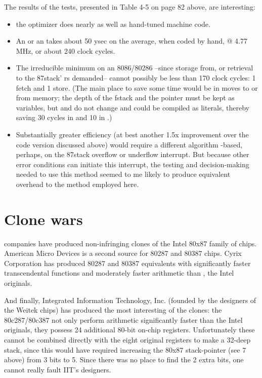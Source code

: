 The results of the tests, presented in Table 4-5 on page 82 above,
are interesting:
\begin{itemize}
    \item the optimizer does nearly as well as hand-tuned machine code.
    \item An  or an  takes about 50 ysec on the average, when coded by hand, @ 4.77 MHz, or about 240 clock cycles.
    \item The irreducible minimum on an 8086/80286 --since  storage from, or retrieval to the 87stack' rs demanded-- cannot possibly be less than 170 clock cycles: 1 fetch and 1 store. (The main place to save some time would be in moves to or from memory; the depth of the fstack and the pointer must be kept as variables, but  and  do not change and could be compiled as literals, thereby saving 30 cycles in  and 10 in .)
    \item Substantially greater efficiency (at best another 1.5x improvement over the code version discussed above) would require a different algorithm -based, perhaps, on the 87stack overflow or underflow interrupt. But because other error conditions can initiate this interrupt, the testing and decision-making needed to use this method seemed to me likely to produce equivalent overhead to the method employed here.
\end{itemize}
\section{Clone wars}

 companies have produced non-infringing clones of the Intel 80x87 family of chips. American Micro Devices is a second source for 80287 and 80387 chips. Cyrix Corporation has produced 80287 and 80387 equivalents with significantly faster transcendental functions and moderately faster arithmetic than , the Intel originals.

And finally, Integrated Information Technology, Inc. (founded by the designers of the Weitek chips) has produced the most interesting of the clones: the 80c287/80c387 not only perform arithmetic significantly faster than the Intel originals, they possess 24 additional 80-bit on-chip registers. Unfortunately these cannot be combined directly with the eight original registers to make a 32-deep stack, since this would have required increasing the 80x87 stack-pointer (see 7 above) from 3 bits to 5. Since there was no place to find the 2 extra bits, one cannot really fault IIT's designers.


